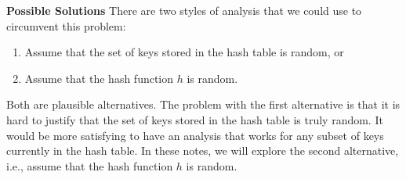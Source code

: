 \documentclass [12pt]{article}
\begin{document}
\textbf{Possible Solutions} 
There are two styles of analysis that we could use to circumvent this problem: 

\begin{enumerate}
  \item Assume that the set of keys stored in the hash table is random, or 
  \item Assume that the hash function $h$ is random. 
\end{enumerate}

Both are plausible alternatives. The problem with the first alternative is that it is hard to justify that the set of keys stored in the hash table is truly random. It would be more satisfying to have an analysis that works for any subset of keys currently in the hash table. In these notes, we will explore the second alternative, i.e., assume that the hash function $h$ is random.
\end{document}
